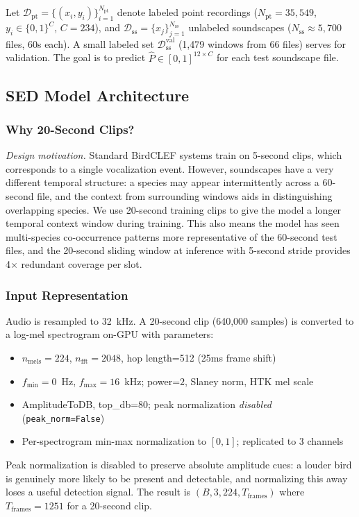\documentclass[journal]{IEEEtran}
\begin{document}
Let $\mathcal{D}_\text{pt} = \{(x_i, y_i)\}_{i=1}^{N_\text{pt}}$ denote labeled point recordings ($N_\text{pt}=35{,}549$, $y_i \in \{0,1\}^{C}$, $C=234$), and $\mathcal{D}_\text{ss} = \{x_j\}_{j=1}^{N_\text{ss}}$ unlabeled soundscapes ($N_\text{ss}\approx5{,}700$ files, 60s each).
A small labeled set $\mathcal{D}_\text{ss}^\text{val}$ (1,479 windows from 66 files) serves for validation.
The goal is to predict $\hat{P} \in [0,1]^{12 \times C}$ for each test soundscape file.

\subsection{SED Model Architecture}

\subsubsection{Why 20-Second Clips?}

\emph{Design motivation.}
Standard BirdCLEF systems train on 5-second clips, which corresponds to a single vocalization event.
However, soundscapes have a very different temporal structure: a species may appear intermittently across a 60-second file, and the context from surrounding windows aids in distinguishing overlapping species.
We use 20-second training clips to give the model a longer temporal context window during training.
This also means the model has seen multi-species co-occurrence patterns more representative of the 60-second test files, and the 20-second sliding window at inference with 5-second stride provides 4$\times$ redundant coverage per slot.

\subsubsection{Input Representation}

Audio is resampled to 32~kHz. A 20-second clip (640,000 samples) is converted to a log-mel spectrogram on-GPU with parameters:
\begin{itemize}
  \item $n_\text{mels}=224$, $n_\text{fft}=2048$, hop length=512 (25ms frame shift)
  \item $f_\text{min}=0$~Hz, $f_\text{max}=16$~kHz; power=$2$, Slaney norm, HTK mel scale
  \item AmplitudeToDB, top\_db=80; peak normalization \emph{disabled} (\texttt{peak\_norm=False})
  \item Per-spectrogram min-max normalization to $[0,1]$; replicated to 3 channels
\end{itemize}
Peak normalization is disabled to preserve absolute amplitude cues: a louder bird is genuinely more likely to be present and detectable, and normalizing this away loses a useful detection signal.
The result is $(B, 3, 224, T_\text{frames})$ where $T_\text{frames}=1251$ for a 20-second clip.
\end{document}
